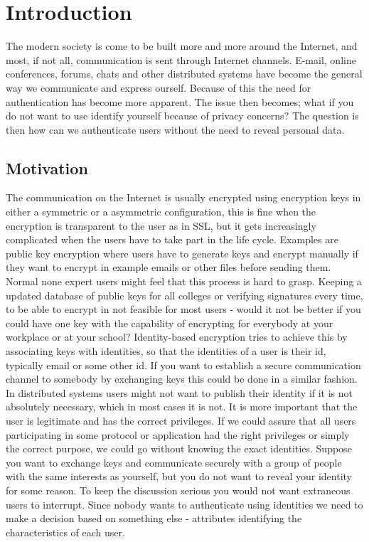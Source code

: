 \chapter{Introduction}
\label{chp:intro} 
The modern society is come to be built more and more around the Internet, and most, if not all, communication is sent through Internet channels. E-mail, online conferences, forums, chats and other distributed systems have become the general way we communicate and express ourself. Because of this the need for authentication has become more apparent. The issue then becomes; what if you do not want to use identify yourself because of privacy concerns? The question is then how can we authenticate users without the need to reveal personal data.

\section{Motivation}
The communication on the Internet is usually encrypted using encryption keys in either a symmetric or a asymmetric configuration, this is fine when the encryption is transparent to the user as in SSL, but it gets increasingly complicated when the users have to take part in the life cycle. Examples are public key encryption where users have to generate keys and encrypt manually if they want to encrypt in example emails or other files before sending them. Normal none expert users might feel that this process is hard to grasp. Keeping a updated database of public keys for all colleges or verifying signatures every time, to be able to encrypt in not feasible for most users - would it not be better if you could have one key with the capability of encrypting for everybody at your workplace or at your school? Identity-based encryption tries to achieve this by associating keys with identities, so that the identities of a user is their id, typically email or some other id. If you want to establish a secure communication channel to somebody by exchanging keys this could be done in a similar fashion.
In distributed systems users might not want to publish their identity if it is not absolutely necessary, which in most cases it is not. It is more important that the user is legitimate and has the correct privileges. If we could assure that all users participating in some protocol or application had the right privileges or simply the correct purpose, we could go without knowing the exact identities. Suppose you want to exchange keys and communicate securely with a group of people with the same interests as yourself, but you do not want to reveal your identity for some reason. To keep the discussion serious you would not want extraneous users to interrupt. Since nobody wants to authenticate using identities we need to make a decision based on something else - attributes identifying the characteristics of each user. 

